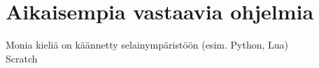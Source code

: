 
\section{Aikaisempia vastaavia ohjelmia}
Monia kieliä on käännetty selainympäristöön (esim. Python, Lua) \cite{repl.it}
\\
Scratch